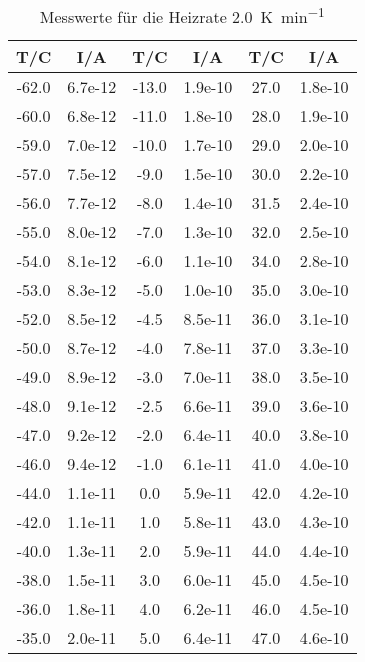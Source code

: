 \begin{table}[!]
  \centering
  \caption{Messwerte für die Heizrate \SI{2.0}{\kelvin\per\minute}}
\begin{tabular}{cc|cc|cc}
        T/C & I/A &T/C  & I/A &T/C & I/A \\
\midrule
       -62.0 &  6.7e-12 &       -13.0 &  1.9e-10 &        27.0 &  1.8e-10 \\
       -60.0 &  6.8e-12 &       -11.0 &  1.8e-10 &        28.0 &  1.9e-10 \\
       -59.0 &  7.0e-12 &       -10.0 &  1.7e-10 &        29.0 &  2.0e-10 \\
       -57.0 &  7.5e-12 &        -9.0 &  1.5e-10 &        30.0 &  2.2e-10 \\
       -56.0 &  7.7e-12 &        -8.0 &  1.4e-10 &        31.5 &  2.4e-10 \\
       -55.0 &  8.0e-12 &        -7.0 &  1.3e-10 &        32.0 &  2.5e-10 \\
       -54.0 &  8.1e-12 &        -6.0 &  1.1e-10 &        34.0 &  2.8e-10 \\
       -53.0 &  8.3e-12 &        -5.0 &  1.0e-10 &        35.0 &  3.0e-10 \\
       -52.0 &  8.5e-12 &        -4.5 &  8.5e-11 &        36.0 &  3.1e-10 \\
       -50.0 &  8.7e-12 &        -4.0 &  7.8e-11 &        37.0 &  3.3e-10 \\
       -49.0 &  8.9e-12 &        -3.0 &  7.0e-11 &        38.0 &  3.5e-10 \\
       -48.0 &  9.1e-12 &        -2.5 &  6.6e-11 &        39.0 &  3.6e-10 \\
       -47.0 &  9.2e-12 &        -2.0 &  6.4e-11 &        40.0 &  3.8e-10 \\
       -46.0 &  9.4e-12 &        -1.0 &  6.1e-11 &        41.0 &  4.0e-10 \\
       -44.0 &  1.1e-11 &         0.0 &  5.9e-11 &        42.0 &  4.2e-10 \\
       -42.0 &  1.1e-11 &         1.0 &  5.8e-11 &        43.0 &  4.3e-10 \\
       -40.0 &  1.3e-11 &         2.0 &  5.9e-11 &        44.0 &  4.4e-10 \\
       -38.0 &  1.5e-11 &         3.0 &  6.0e-11 &        45.0 &  4.5e-10 \\
       -36.0 &  1.8e-11 &         4.0 &  6.2e-11 &        46.0 &  4.5e-10 \\
       -35.0 &  2.0e-11 &         5.0 &  6.4e-11 &        47.0 &  4.6e-10 \\

\end{tabular}
\end{table}
